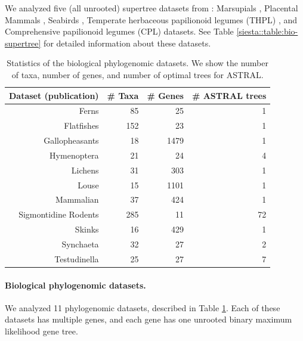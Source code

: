 We analyzed five (all unrooted) supertree datasets from \cite{smidgen}:  
 Marsupials \cite{marsupial}, Placental Mammals \cite{placental},
Seabirds \cite{kennedy2002seabird}, 
Temperate herbaceous papilionoid legumes (THPL) \cite{THPL},  and 
Comprehensive papilionoid legumes (CPL) \cite{cpl} datasets.
See Table \ref{siesta::table:bio-supertree} for detailed information about these datasets. 
 
 

  
  

\begin{table}
\centering
\begin{tabular}{|r|r|r|r|}
  \hline
  Dataset (publication) & \# Taxa & \# Genes & \# ASTRAL trees \\
  \hline
  Ferns \cite{rothfels2015evolutionary} &85 & 25 & 1 \\
  Flatfishes \cite{betancur2014molecular} & 152 & 23 & 1 \\
  Gallopheasants \cite{meiklejohn2016analysis} & 18 & 1479 & 1 \\
  Hymenoptera \cite{sharanowski2010expressed} & 21 & 24 & 4 \\
  Lichens \cite{leavitt2016resolving} & 31 & 303 & 1 \\
  Louse \cite{allen2017phylogenomics} & 15 & 1101 & 1 \\
  Mammalian \cite{Song2012} & 37 & 424 & 1 \\
  Sigmontidine Rodents \cite{maestri2017ecology} & 285 & 11 & 72 \\
  Skinks \cite{linkem2016detecting} & 16 & 429 & 1 \\
  Synchaeta \cite{tang2014effects} & 32 & 27 & 2 \\
  Testudinella \cite{tang2014effects} & 25 & 27 & 7 \\
  \hline
\end{tabular}

\caption[Statistics of the biological phylogenomic
  datasets for SIESTA study]{Statistics of the biological phylogenomic
  datasets. We show the number of taxa, number of genes, and number of optimal trees for ASTRAL.} 
  \label{siesta::table:bio-phylogenomic}

\end{table}



\paragraph{Biological phylogenomic datasets. }
We analyzed 11 phylogenomic datasets, described in Table  \ref{siesta::table:bio-phylogenomic}.
Each of these datasets has multiple genes,  and
each gene has one unrooted binary maximum likelihood gene tree.


